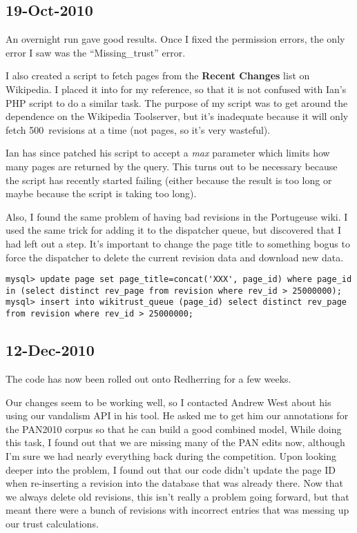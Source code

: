 \subsection{19-Oct-2010}

An overnight run gave good results.
Once I fixed the permission errors, the only error I saw was
the ``Missing\_trust'' error.

I also created a script to fetch pages from the \textbf{Recent
Changes} list on Wikipedia.
I placed it into  for my reference, so that
it is not confused with Ian's PHP script to do a similar task.
The purpose of my script was to get around the dependence on the
Wikipedia Toolserver, but it's inadequate because it will only fetch
500~revisions at a time (not pages, so it's very wasteful).

Ian has since patched his script to accept a \textit{max} parameter
which limits how many pages are returned by the query.
This turns out to be necessary because the script has recently started
failing (either because the result is too long or maybe because the
script is taking too long).

Also, I found the same problem of having bad revisions in the
Portugeuse wiki.
I used the same trick for adding it to the dispatcher queue,
but discovered that I had left out a step.
It's important to change the page title to something bogus to force
the dispatcher to delete the current revision data and download new data.
\begin{verbatim}
mysql> update page set page_title=concat('XXX', page_id) where page_id
in (select distinct rev_page from revision where rev_id > 25000000);
mysql> insert into wikitrust_queue (page_id) select distinct rev_page from revision where rev_id > 25000000;
\end{verbatim}

\subsection{12-Dec-2010}

The code has now been rolled out onto Redherring for a few weeks.

Our changes seem to be working well, so I contacted Andrew West about
his using our vandalism API in his tool.
He asked me to get him our annotations for the PAN2010 corpus
so that he can build a good combined model,
While doing this task, I found out that we are missing many of the
PAN edits now, although I'm sure we had nearly everything back
during the competition.
Upon looking deeper into the problem, I found out that our code didn't
update the page ID when re-inserting a revision into the database that
was already there.
Now that we always delete old revisions, this isn't really a problem
going forward, but that meant there were a bunch of revisions with
incorrect entries that was messing up our trust calculations.

